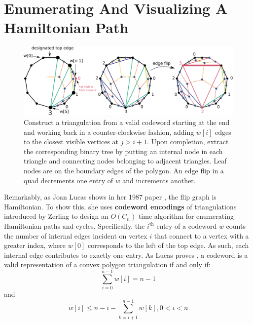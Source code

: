 \documentclass[english]{socg-lipics-v2021}
\begin{document}
\section{Enumerating And Visualizing A Hamiltonian Path}


\begin{figure}
    \centering
    \includegraphics[width=\textwidth]{elevengon.pdf}
    \caption{Construct a triangulation from a valid codeword starting at the end and working back in a counter-clockwise fashion, adding $w[i]$ edges to the closest visible vertices at $j > i+1$.  Upon completion, extract the corresponding binary tree by putting an internal node in each triangle and connecting nodes belonging to adjacent triangles.  Leaf nodes are on the boundary edges of the polygon.  An edge flip in a quad decrements one entry of $w$ and increments another.}
    \label{fig:construct}
\end{figure}

Remarkably, as Joan Lucas shows in her 1987 paper \cite{lucas1987rotation}, the flip graph is Hamiltonian.  To show this, she uses \textbf{codeword encodings} of triangulations introduced by Zerling \cite{zerling1985generating} to design an $O(C_n)$ time algorithm for enumerating Hamiltonian paths and cycles.  Specifically, the $i^{\text{th}}$ entry of a codeword $w$ counts the number of internal edges incident on vertex $i$ that connect to a vertex with a greater index, where $w[0]$ corresponds to the left of the top edge.  As such, each internal edge contributes to exactly one entry.  As Lucas proves \cite{lucas1987rotation}, a codeword is a valid representation of a convex polygon triangulation if and only if:
\begin{equation}
    \label{eq:valid1}
    \sum_{i=0}^{n-1} w[i] = n-1
\end{equation}
and
\begin{equation}
    \label{eq:valid2}
    w[i] \leq n - i - \sum_{k=i+1}^{n-1} w[k], 0 < i < n
\end{equation}
\end{document}
